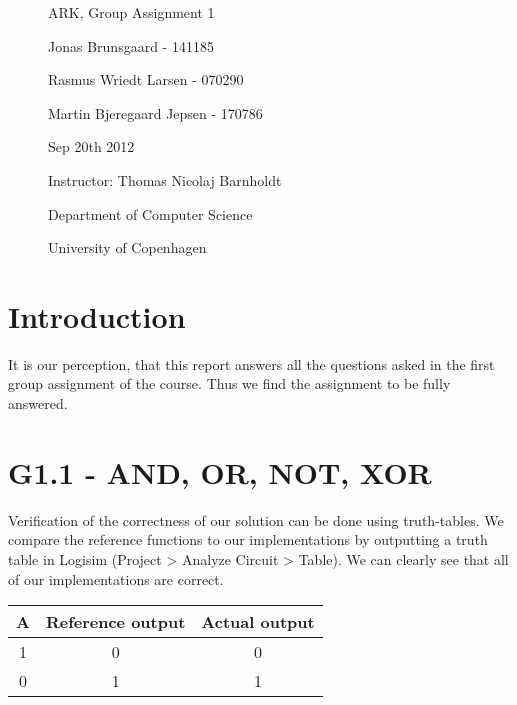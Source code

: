 \documentclass[11pt,a4paper]{article}
\begin{document}
\begin{figure}
  \thispagestyle{empty}
  \centering
    \vspace*{0.5cm}
    {\Huge ARK, Group Assignment 1 \par
    }\par
    \par
    \vspace*{0.4cm}
    \large Jonas Brunsgaard - 141185 \par
        Rasmus Wriedt Larsen - 070290 \par
        Martin Bjeregaard Jepsen - 170786 \par
    \vspace*{0.4cm}
    Sep 20th 2012 \par
    \vspace*{0.4cm}
    \small Instructor: Thomas Nicolaj Barnholdt \par
    \vspace*{0.4cm}
    \small Department of Computer Science \par
    \small University of Copenhagen \par
\end{figure}
\clearpage
\thispagestyle{plain}

\section*{Introduction}
It is our perception, that this report answers all the questions asked in the
first group assignment of the course. Thus we find the assignment to be fully
answered.

\section*{G1.1 - AND, OR, NOT, XOR}

Verification of the correctness of our solution can be done using truth-tables. We compare the reference
functions to our implementations by outputting a truth table in Logisim (Project > Analyze Circuit > Table).
We can clearly see that all of our implementations are correct.

\begin{table}[htb!]
    \centering
    \begin{tabular}{c || c || c}
    A & Reference output & Actual output \\ \hline
    1 & 0                & 0             \\
    0 & 1                & 1             \\
    \end{tabular}
\end{table}
\end{document}
